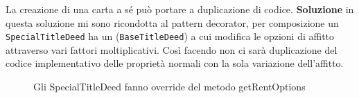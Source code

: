 La creazione di una carta a sé può portare a duplicazione di codice. \newline
\textbf{Soluzione}\newline
in questa soluzione mi sono ricondotta al pattern decorator, per composizione un \texttt{SpecialTitleDeed} ha un (\texttt{BaseTitleDeed}) a cui modifica le opzioni di affitto attraverso vari fattori moltiplicativi.
Così facendo non ci sarà duplicazione del codice implementativo delle proprietà normali con la sola variazione dell'affitto.
\begin{figure}[H]
    \centering
    \caption{Gli SpecialTitleDeed fanno override del metodo getRentOptions}
    \label{img:ArchitectureDiagram-Pagina-3}
\end{figure}

